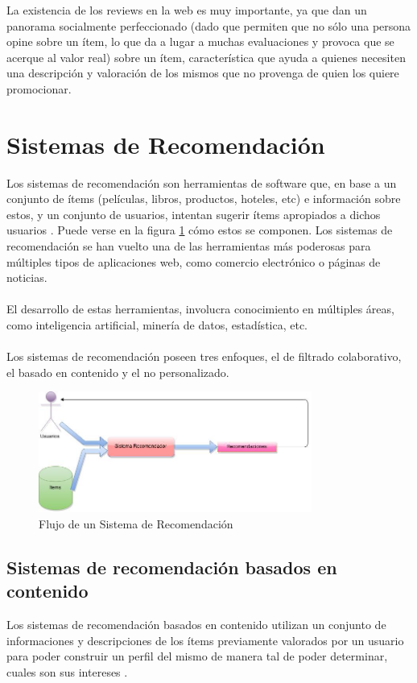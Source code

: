 La existencia de los reviews en la web es muy importante, ya que dan un panorama socialmente perfeccionado (dado que permiten que no sólo una persona
opine sobre un ítem, lo que da a lugar a muchas evaluaciones y provoca que se acerque al valor real) sobre un ítem, característica que ayuda a 
quienes necesiten una descripción y valoración de los mismos que no provenga de quien los quiere promocionar.

\section{Sistemas de Recomendación}
\label{section:sistemas-de-recomendacion}
\noindent Los sistemas de recomendación son herramientas de software que, en base a un conjunto de ítems (películas, libros, productos, hoteles, etc) e información sobre estos, y un conjunto de usuarios, intentan sugerir ítems apropiados a dichos usuarios \cite{Systems2011}. Puede verse en la figura \ref{figure:flujo} cómo estos se componen. Los sistemas de recomendación se han vuelto una de las herramientas más poderosas para múltiples tipos de aplicaciones web, como comercio electrónico o páginas de noticias. 
\\\\
El desarrollo de estas herramientas, involucra conocimiento en múltiples áreas, como inteligencia artificial, minería de datos, estadística, etc. 
\\\\
Los sistemas de recomendación poseen tres enfoques, el de filtrado colaborativo, el basado en contenido y el no personalizado.


\begin{figure}
    \centering
    \includegraphics[width=0.8\textwidth,natwidth=610,natheight=642]{recSis}
    \caption{Flujo de un Sistema de Recomendación}
    \label{figure:flujo}
\end{figure}

\subsection{Sistemas de recomendación basados en contenido}
Los sistemas de recomendación basados en contenido utilizan un conjunto de informaciones y descripciones de los ítems previamente valorados por un usuario para poder construir un perfil del mismo de manera tal de poder determinar, cuales son sus intereses  \cite{Systems2011}.

